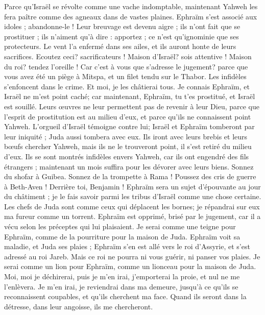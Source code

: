 \begin{multicols}{2}
Parce qu'Israël se révolte comme une vache indomptable, maintenant Yahweh les fera paître comme des agneaux dans de vastes plaines.
Ephraïm s'est associé aux idoles ; abandonne-le !
Leur breuvage est devenu aigre ; ils n'ont fait que se prostituer ; ils n'aiment qu'à dire : apportez ; ce n'est qu'ignominie que ses protecteurs.
Le vent l'a enfermé dans ses ailes, et ils auront honte de leurs sacrifices.
\VerseOne{}Ecoutez ceci? sacrificateurs ! Maison d'Israël? sois attentive ! Maison du roi? tendez l'oreille ! Car c'est à vous que s'adresse le jugement? parce que vous avez été un piège à Mitspa, et un filet tendu sur le Thabor.
Les infidèles s'enfoncent dans le crime. Et moi, je les châtierai tous.
Je connais Ephraïm, et Israël ne m'est point caché; car maintenant, Ephraïm, tu t'es prostitué, et Israël est souillé.
Leurs œuvres ne leur permettent pas de revenir à leur Dieu, parce que l'esprit de prostitution est au milieu d'eux, et parce qu'ils ne connaissent point Yahweh.
L'orgueil d'Israël témoigne contre lui; Israël et Ephraïm tomberont par leur iniquité ; Juda aussi tombera avec eux.
Ils iront avec leurs brebis et leurs bœufs chercher Yahweh, mais ils ne le trouveront point, il s'est retiré du milieu d'eux.
Ils se sont montrés infidèles envers Yahweh, car ils ont engendré des fils étrangers ; maintenant un mois suffira pour les dévorer avec leurs biens.
Sonnez du shofar à Guibea. Sonnez de la trompette à Rama ! Poussez des cris de guerre à Beth-Aven ! Derrière toi, Benjamin !
Ephraïm sera un sujet d'épouvante au jour du châtiment ; je le fais savoir parmi les tribus d'Israël comme une chose certaine.
Les chefs de Juda sont comme ceux qui déplacent les bornes; je répandrai sur eux ma fureur comme un torrent.
Ephraïm est opprimé, brisé par le jugement, car il a vécu selon les préceptes qui lui plaisaient.
Je serai comme une teigne pour Ephraïm, comme de la pourriture pour la maison de Juda.
Ephraïm voit sa maladie, et Juda ses plaies ; Ephraïm s'en est allé vers le roi d'Assyrie, et s'est adressé au roi Jareb. Mais ce roi ne pourra ni vous guérir, ni panser vos plaies.
Je serai comme un lion pour Ephraïm, comme un lionceau pour la maison de Juda. Moi, moi je déchirerai, puis je m'en irai, j'emporterai la proie, et nul ne me l'enlèvera.
Je m'en irai, je reviendrai dans ma demeure, jusqu'à ce qu'ils se reconnaissent coupables, et qu'ils cherchent ma face. Quand ils seront dans la détresse, dans leur angoisse, ils me chercheront.

\end{multicols}
